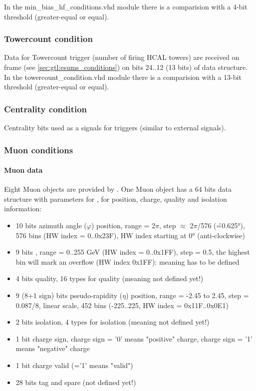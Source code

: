 In the min\_bias\_hf\_conditions.vhd module there is a comparision with a 4-bit threshold (greater-equal or equal).

\subsubsection{Towercount condition}
\label{sec:gtl:towercount_cond}

Data for Towercount trigger (number of firing HCAL towers) are received on frame \htt (see \ref{sec:gtl:esums_conditions}) on bits 24..12 (13 bits) of \htt data structure. 
In the towercount\_condition.vhd module there is a comparision with a 13-bit threshold (greater-equal or equal).

\subsubsection{Centrality condition}
\label{sec:gtl:centrality_cond}

Centrality bits used as a signals for triggers (similar to external signals).

\subsubsection{Muon conditions}
\label{sec:gtl:muon_conditions}

\paragraph{Muon data}
\label{sec:gtl:muon_data}
Eight Muon objects are provided by \gmt. One Muon object has a 64 bits data structure with parameters for \pt, for position, charge, quality and isolation information: 
\begin{itemize}
\item 10 bits azimuth angle ($\varphi$) position, range = 2$\pi$, step $\approx$ 2$\pi$/576 (\^=0.625°), 576 bins (HW index = 0..0x23F), HW index starting at 0° (anti-clockwise)
\item 9 bits \pt, range = 0..255 GeV (HW index = 0..0x1FF), step = 0.5, the highest bin will mark an overflow (HW index 0x1FF): meaning has to be defined
\item 4 bits quality, 16 types for quality (meaning not defined yet!)
\item 9 (8+1 sign) bits pseudo-rapidity ($\eta$) position, range = -2.45 to 2.45, step = 0.087/8, linear scale, 452 bins (-225..225, HW index = 0x11F..0x0E1)
\item 2 bits isolation, 4 types for isolation (meaning not defined yet!)
\item 1 bit charge sign, charge sign = '0' means "positive" charge, charge sign = '1' means "negative" charge
\item 1 bit charge valid (='1' means "valid")
\item 28 bits tag and spare (not defined yet!)
\end{itemize}

